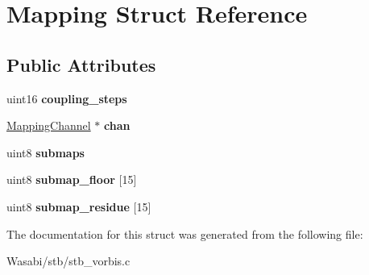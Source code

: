 \hypertarget{struct_mapping}{}\section{Mapping Struct Reference}
\label{struct_mapping}
\subsection*{Public Attributes}
\begin{DoxyCompactItemize}
\item 
uint16 {\bfseries coupling\+\_\+steps}\hypertarget{struct_mapping_a3d85724ef6fa7567622ef3b7e32e461f}{}\label{struct_mapping_a3d85724ef6fa7567622ef3b7e32e461f}

\item 
\hyperlink{struct_mapping_channel}{Mapping\+Channel} $\ast$ {\bfseries chan}\hypertarget{struct_mapping_a79ba491724417d271e3bdfbcef30ed3a}{}\label{struct_mapping_a79ba491724417d271e3bdfbcef30ed3a}

\item 
uint8 {\bfseries submaps}\hypertarget{struct_mapping_a85f22d25e206512903dcc39798939082}{}\label{struct_mapping_a85f22d25e206512903dcc39798939082}

\item 
uint8 {\bfseries submap\+\_\+floor} \mbox{[}15\mbox{]}\hypertarget{struct_mapping_ac5dc79c03a3b43ee554a081a5c37f70f}{}\label{struct_mapping_ac5dc79c03a3b43ee554a081a5c37f70f}

\item 
uint8 {\bfseries submap\+\_\+residue} \mbox{[}15\mbox{]}\hypertarget{struct_mapping_a1b43a75bd402085e05799fc7bccc0600}{}\label{struct_mapping_a1b43a75bd402085e05799fc7bccc0600}

\end{DoxyCompactItemize}


The documentation for this struct was generated from the following file\+:\begin{DoxyCompactItemize}
\item 
Wasabi/stb/stb\+\_\+vorbis.\+c\end{DoxyCompactItemize}
